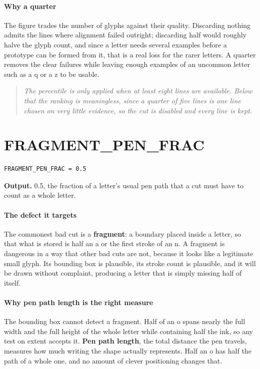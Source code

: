 \paragraph{Why a quarter}
The figure trades the number of glyphs against their quality. Discarding nothing admits the lines where alignment failed outright; discarding half would roughly halve the glyph count, and since a letter needs several examples before a prototype can be formed from it, that is a real loss for the rarer letters. A quarter removes the clear failures while leaving enough examples of an uncommon letter such as a q or a z to be usable.


\begin{quote}\small\itshape The percentile is only applied when at least eight lines are available. Below that the ranking is meaningless, since a quarter of five lines is one line chosen on very little evidence, so the cut is disabled and every line is kept.\end{quote}

\section{FRAGMENT\_PEN\_FRAC}
\begin{lstlisting}[style=sig]
FRAGMENT_PEN_FRAC = 0.5
\end{lstlisting}

\noindent\textbf{Output.} 0.5, the fraction of a letter's usual pen path that a cut must have to count as a whole letter.


\paragraph{The defect it targets}
The commonest bad cut is a \textbf{fragment}: a boundary placed inside a letter, so that what is stored is half an a or the first stroke of an n. A fragment is dangerous in a way that other bad cuts are not, because it looks like a legitimate small glyph. Its bounding box is plausible, its stroke count is plausible, and it will be drawn without complaint, producing a letter that is simply missing half of itself.


\paragraph{Why pen path length is the right measure}
The bounding box cannot detect a fragment. Half of an o spans nearly the full width and the full height of the whole letter while containing half the ink, so any test on extent accepts it. \textbf{Pen path length}, the total distance the pen travels, measures how much writing the shape actually represents. Half an o has half the path of a whole one, and no amount of clever positioning changes that.


